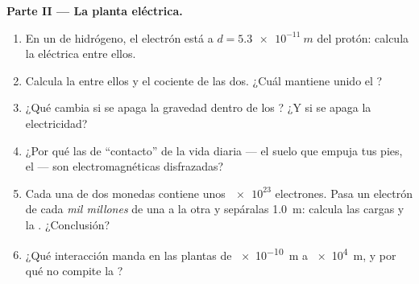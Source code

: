 \begin{problem}
\medskip
\noindent\textbf{Parte II --- La planta eléctrica.}
\begin{enumerate}[resume]
  \item En un  de hidrógeno, el electrón está a
        $d = \qty{5.3e-11}{m}$ del protón: calcula la  eléctrica
        entre ellos.
  \item Calcula la  entre ellos y el cociente de las
        dos. ¿Cuál mantiene unido el ?
  \item ¿Qué cambia si se apaga la gravedad dentro de los ? ¿Y si
        se apaga la electricidad?
  \item ¿Por qué las  de ``contacto'' de la vida diaria --- el
        suelo que empuja tus pies, el  --- son
        electromagnéticas disfrazadas?
  \item Cada una de dos monedas contiene unos $\num{e23}$ electrones.
        Pasa un electrón de cada \emph{mil millones} de una a la otra y
        sepáralas \qty{1.0}{m}: calcula las cargas y la .
        ¿Conclusión?
  \item ¿Qué interacción manda en las plantas de \qty{e-10}{m} a
        \qty{e4}{m}, y por qué no compite la ?
\end{enumerate}


\end{problem}
